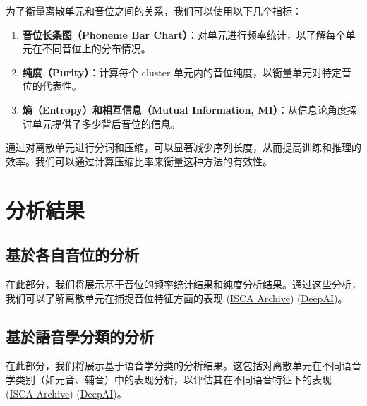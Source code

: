 为了衡量离散单元和音位之间的关系，我们可以使用以下几个指标：

\begin{enumerate}
    \item \textbf{音位长条图（Phoneme Bar Chart）}：对单元进行频率统计，以了解每个单元在不同音位上的分布情况。
    \item \textbf{纯度（Purity）}：计算每个 cluster 单元内的音位纯度，以衡量单元对特定音位的代表性。
    \item \textbf{熵（Entropy）和相互信息（Mutual Information, MI）}：从信息论角度探讨单元提供了多少背后音位的信息。
\end{enumerate}


通过对离散单元进行分词和压缩，可以显著减少序列长度，从而提高训练和推理的效率。我们可以通过计算压缩比率来衡量这种方法的有效性。

 


\section{分析結果}


\subsection{基於各自音位的分析}

在此部分，我们将展示基于音位的频率统计结果和纯度分析结果。通过这些分析，我们可以了解离散单元在捕捉音位特征方面的表现 (\href{https://www.isca-archive.org/interspeech_2022/ren22_interspeech.html}{ISCA Archive}) (\href{https://deepai.org/publication/speech-pre-training-with-acoustic-piece}{DeepAI})。

\subsection{基於語音學分類的分析}


在此部分，我们将展示基于语音学分类的分析结果。这包括对离散单元在不同语音学类别（如元音、辅音）中的表现分析，以评估其在不同语音特征下的表现 (\href{https://www.isca-archive.org/interspeech_2022/ren22_interspeech.html}{ISCA Archive}) (\href{https://deepai.org/publication/speech-pre-training-with-acoustic-piece}{DeepAI})。



 

